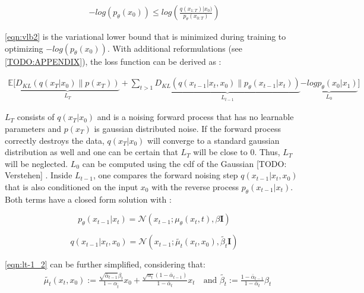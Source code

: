 \begin{equation}
  \label{eqn:vlb2}
  \begin{align*}
    -log(p_\theta(x_0)) \leq log(\frac{q(x_{1:T})|x_0)}{p_\theta(x_{0:T})})
  \end{align*}
\end{equation}

\autoref{eqn:vlb2} is the variational lower bound that is minimized during training to optimizing $-log(p_\theta(x_0))$.
With additional reformulations (see \autoref{TODO:APPENDIX}), the loss function can be derived as \cite{ho2020DenoisingDiffusionProbabilistic}:

\begin{equation}
  \label{eqn:vlb3}
  \begin{align*}
   \mathbb{E}\biggl[\underbrace{D_{KL}(q(x_{T}|x_0) \parallel p(x_T))}_{L_T} + \sum_{t>1}^{} \underbrace{  D_{KL}(q(x_{t-1}|x_t,x_0) \parallel p_\theta(x_{t-1}|x_t)) }_{L_{t-1}}  \underbrace{ -log p_\theta(x_0|x_1) }_{L_{0}}\biggr]
  \end{align*}
\end{equation}

$L_T$ consists of $q(x_{T}|x_0)$ and is a noising forward process that has no learnable parameters and $p(x_T)$ is gaussian distributed noise.
If the forward process correctly destroys the data, $q(x_{T}|x_0)$ will converge to a standard gaussian distribution as well and one can be certain that $L_T$ will be close to $0$.
Thus, $L_T$ will be neglected.
$L_{0}$ can be computed using the \gls{cdf} of the Gaussian [TODO: Verstehen] \cite{nichol2021ImprovedDenoisingDiffusion}.
Inside $L_{t-1}$, one compares the forward noising step $q(x_{t-1}|x_t,x_0)$ that is also conditioned on the input $x_0$ with the reverse process $p_\theta(x_{t-1}|x_t)$.
Both terms have a closed form solution with \cite{ho2020DenoisingDiffusionProbabilistic}:

\begin{equation}
  \label{eqn:lt-1_1}
  p_\theta(x_{t-1}|x_t)= \mathcal{N}(x_{t-1};\mu_\theta(x_t,t), \beta\textbf{I})
\end{equation}

\begin{equation}
  \label{eqn:lt-1_2}
q(x_{t-1}|x_t,x_0) = \mathcal{N}(x_{t-1};\tilde{\mu_t}(x_t,x_0), \tilde{\beta_t}\textbf{I})
\end{equation}


\autoref{eqn:lt-1_2} can be further simplified, considering that:
\begin{equation}
  \begin{align}
    &\tilde{\mu_t}(x_t, x_0) := \frac{\sqrt{\bar{\alpha}_{t-1}}\beta_t}{1 - \alpha_{\bar{t}}}x_0 +   \frac{\sqrt{\alpha_t}(1-\bar{\alpha}_{t-1})}{1 - \bar{\alpha}_{t}}x_t \quad \textrm{and }
    \tilde{\beta_t}:=\frac{1-\bar{\alpha}_{t-1}}{1-\bar{\alpha}_t}\beta_t \nonumber\\
  \end{align}
\end{equation}
    
